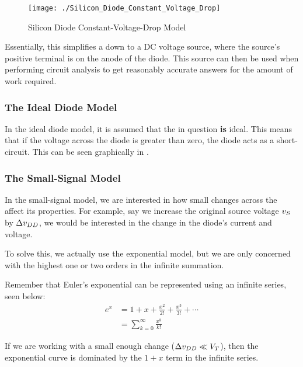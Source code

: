 \begin{figure}[h!tbp]
  \centering
  \texttt{[image: ./Silicon\_Diode\_Constant\_Voltage\_Drop]}
  \caption{Silicon Diode Constant-Voltage-Drop Model \parencite[p.~193]{sedraTextbook7}}
  \label{fig:Silicon_Diode_Constant_Voltage_Drop}
\end{figure}

Essentially, this simplifies a  down to a DC voltage source, where the source's positive terminal is on the anode of the diode.
This source can then be used when performing circuit analysis to get reasonably accurate answers for the amount of work required.

\subsubsection{The Ideal Diode Model}\label{subsubsec:Ideal_Diode_Model}
In the ideal diode model, it is assumed that the  in question \textbf{is} ideal.
This means that if the voltage across the diode is greater than zero, the diode acts as a short-circuit.
This can be seen graphically in .

\subsubsection{The Small-Signal Model}\label{subsubsec:Diode_Small-Signal_Model}
In the small-signal model, we are interested in how small changes across the  affect its properties.
For example, say we increase the original source voltage $v_{S}$ by $\Delta v_{DD}$, we would be interested in the change in the diode's current and voltage.

To solve this, we actually use the exponential model, but we are only concerned with the highest one or two orders in the infinite summation.

\begin{blackbox}
  Remember that Euler's exponential can be represented using an infinite series, seen below:
  \begin{align*}
    e^{x} &= 1 + x + \frac{x^{2}}{2!} + \frac{x^{3}}{3!} + \cdots \\
    &= \sum\limits_{k = 0}^{\infty} \frac{x^{k}}{k!}
  \end{align*}
\end{blackbox}

If we are working with a small enough change ($\Delta v_{DD} \ll V_{T}$), then the exponential curve is dominated by the $1+x$ term in the infinite series.

